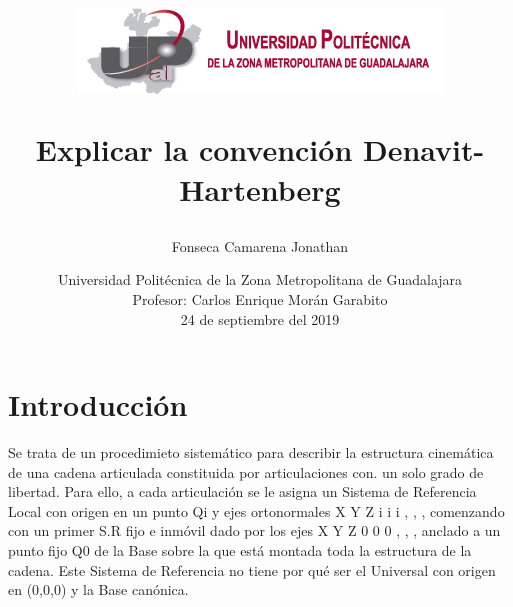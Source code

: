 \documentclass[12pt,a4paper]{report}
\begin{document}
\author{Fonseca Camarena Jonathan}

\title{\begin{center}
\includegraphics[scale=1.5]{Escudo.png} 
\end{center}Explicar la convención Denavit-Hartenberg}

\date{
Universidad Politécnica de la Zona Metropolitana de Guadalajara\\
Profesor: Carlos Enrique Morán Garabito\\
24 de septiembre del 2019}

\maketitle
\tableofcontents
\section{Introducción}
Se trata de un procedimieto sistemático para describir la estructura cinemática de una cadena articulada
constituida por articulaciones con. un solo grado de libertad.
Para ello, a cada articulación se le asigna un Sistema de Referencia Local con origen en un punto Qi
 y ejes
ortonormales { X Y Z i i i , , } , comenzando con un primer S.R fijo e inmóvil dado por los ejes { X Y Z 0 0 0 , , } ,
anclado a un punto fijo Q0
 de la Base sobre la que está montada toda la estructura de la cadena.
Este Sistema de Referencia no tiene por qué ser el Universal con origen en (0,0,0) y la Base canónica.
\end{document}
